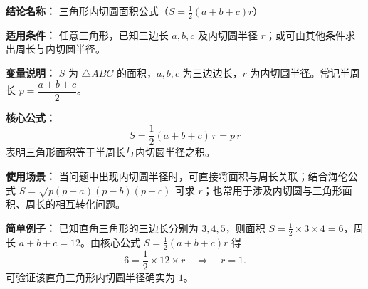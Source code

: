 \textbf{结论名称：} 三角形内切圆面积公式（\(S=\frac{1}{2}(a+b+c)r\)）

\textbf{适用条件：} 任意三角形，已知三边长 \(a,b,c\) 及内切圆半径 \(r\)；或可由其他条件求出周长与内切圆半径。

\textbf{变量说明：} \(S\) 为 \(\triangle ABC\) 的面积，\(a,b,c\) 为三边边长，\(r\) 为内切圆半径。常记半周长 \(p=\dfrac{a+b+c}{2}\)。

\textbf{核心公式：}
\[
\boxed{S = \frac{1}{2}(a+b+c)\,r = p\,r}
\]
表明三角形面积等于半周长与内切圆半径之积。

\textbf{使用场景：} 当问题中出现内切圆半径时，可直接将面积与周长关联；结合海伦公式 \(S=\sqrt{p(p-a)(p-b)(p-c)}\) 可求 \(r\)；也常用于涉及内切圆与三角形面积、周长的相互转化问题。

\textbf{简单例子：} 已知直角三角形的三边长分别为 \(3,4,5\)，则面积 \(S=\frac{1}{2}\times3\times4=6\)，周长 \(a+b+c=12\)。由核心公式 \(S=\frac{1}{2}(a+b+c)r\) 得
\[
6 = \frac{1}{2}\times12\times r \quad\Rightarrow\quad r=1.
\]
可验证该直角三角形内切圆半径确实为 \(1\)。
